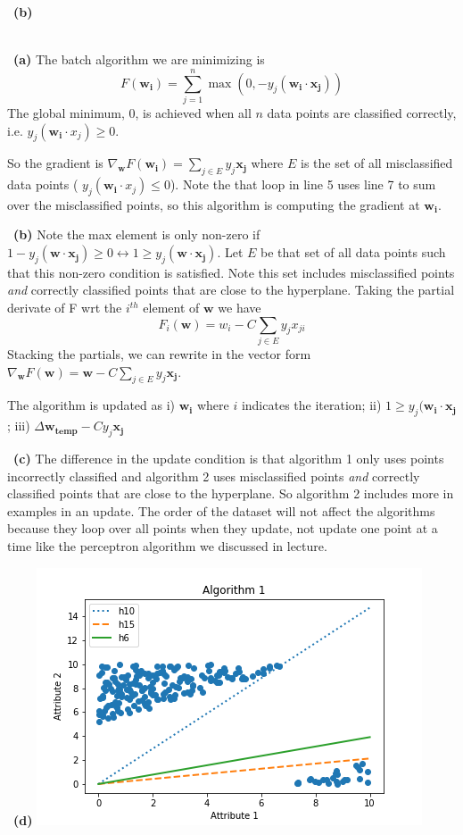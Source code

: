 \documentclass[a4 paper, 15pt]{article}
\numberwithin{equation}{section}
\newcommand{\problem}[1]{~\\\fbox{\textbf{Problem #1}}\newline\newline}
\newcommand{\subproblem}[1]{~\newline\textbf{(#1)}}
\begin{document}
\subproblem{b}

\newpage
\problem{3}
\subproblem{a} The batch algorithm we are minimizing is \begin{equation*}
F(\mathbf{w_{i}}) = \sum_{j=1}^{n}\max(0, -y_{j}(\mathbf{w_{i}}\cdot \mathbf{x_{j}}))
\end{equation*}
The global minimum, 0, is achieved when all $n$ data points are classified correctly, i.e. $ y_{j}(\mathbf{w_{i}}\cdot x_{j}) \geq 0 $.
\par
So the gradient is $\nabla_{\mathbf{w}} F(\mathbf{w_{i}})= \sum_{j\in E}^{} y_{j}\mathbf{x_{j}} $ where $E$ is the set of all misclassified data points ( $y_{j}(\mathbf{w_{i}}\cdot x_{j}) \leq 0$). Note the that loop in line 5 uses line 7 to sum over the misclassified points, so this algorithm is computing the gradient at $\mathbf{w_{i}}$.
\par
\subproblem{b} Note the max element is only non-zero if $ 1 - y_{j}(\mathbf{w}\cdot \mathbf{x_{j}}) \geq 0 \leftrightarrow 1 \geq y_{j}(\mathbf{w}\cdot \mathbf{x_{j}})$.  Let $E$ be that set of all data points such that this non-zero condition is satisfied.  Note this set includes misclassified points \textit{and} correctly classified points that are close to the hyperplane.  Taking the partial derivate of F wrt the $i^{th}$ element of $\mathbf{w}$ we have \begin{equation*}
F_{i}(\mathbf{w}) = w_{i} - C \sum_{j\in E} y_{j}x_{ji}
\end{equation*}
Stacking the partials, we can rewrite in the vector form $ \nabla_{\mathbf{w}} F(\mathbf{w}) = \mathbf{w} - C \sum_{j\in E} y_{j}\mathbf{x_{j}} $.
\par
The algorithm is updated as i) $\mathbf{w_{i}}$ where $i$ indicates the iteration; ii) $ 1 \geq y_{j}(\mathbf{w_{i}}\cdot \mathbf{x_{j}}$; iii) $\Delta\mathbf{w_{temp}} - Cy_{j}\mathbf{x_{j}} $
\par
\subproblem{c} The difference in the update condition is that algorithm 1 only uses points incorrectly classified and algorithm 2 uses misclassified points \textit{and} correctly classified points that are close to the hyperplane. So algorithm 2 includes more in examples in an update.  The order of the dataset will not affect the algorithms because they loop over all points when they update, not update one point at a time like the perceptron algorithm we discussed in lecture.
\par
\subproblem{d}
\includegraphics[scale=.5]{algorithm1}
\end{document}
